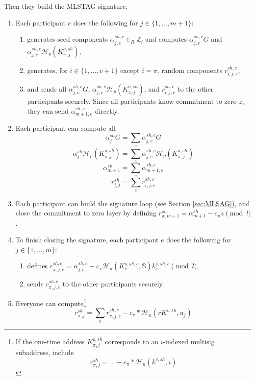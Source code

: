 Then they build the MLSTAG signature.

\begin{enumerate}
    \item Each participant $e$ does the following for $j \in \{1,...,m+1\}$:
    \begin{enumerate}
        \item generates seed components $\alpha^{sh,c}_{j,e} \in_R \mathbb{Z}_l$ and computes $\alpha^{sh,c}_{j,e} G$ and $\alpha^{sh,c}_{j,e} \mathcal{H}_p(K^{o,sh}_{\pi,j})$,
        \item generates, for $i \in \{1,...,v+1\}$ except $i = \pi$, random components $r^{sh,c}_{i,j,e}$,
        \item and sends all $\alpha^{sh,c}_{j,e} G$, $\alpha^{sh,c}_{j,e} \mathcal{H}_p(K^{o,sh}_{\pi,j})$, and $r^{sh,c}_{i,j,e}$ to the other participants securely. Since all participants know commitment to zero $z$, they can send $\alpha^{sh,c}_{m+1,e}$ directly.
    \end{enumerate}
    \item Each participant can compute all
    \[ \alpha^{sh}_{j} G = \sum_e \alpha^{sh,c}_{j,e} G\]
    \[ \alpha^{sh}_{j} \mathcal{H}_p(K^{o,sh}_{\pi,j}) = \sum_e \alpha^{sh,c}_{j,e} \mathcal{H}_p(K^{o,sh}_{\pi,j})\]
    \[ \alpha^{sh}_{m+1} = \sum_e \alpha^{sh,c}_{m+1,e}\]
    \[ r^{sh}_{i,j} = \sum_e r^{sh,c}_{i,j,e}\]
    \item Each participant can build the signature loop (see Section \ref{sec:MLSAG}), and close the commitment to zero layer by defining $r^{sh}_{\pi,m+1} = \alpha^{sh}_{m+1} - c_{\pi} z \pmod l$.
    \item To finish closing the signature, each participant $e$ does the following for $j \in \{1,...,m\}$:
    \begin{enumerate}
        \item defines $r^{sh,c}_{\pi,j,e} = \alpha^{sh,c}_{j,e} - c_{\pi} \mathcal{H}_n(K^{s,sh,c}_e,\mathbb{S}) k^{s,sh,c}_e \pmod l$,
        \item sends $r^{sh,c}_{\pi,j,e}$ to the other participants securely.
    \end{enumerate}
    \item Everyone can compute\footnote{If the one-time address $K^{o,sh}_{\pi,j}$ corresponds to an $i$-indexed multisig subaddress, include
    \[ r^{sh}_{\pi,j} = ... - c_{\pi}*\mathcal{H}_n(k^{v,sh},i)\]}
    \[ r^{sh}_{\pi,j} = \sum_e r^{sh,c}_{\pi,j,e} - c_{\pi}*\mathcal{H}_n(r K^{v,sh}, u_j) \]
\end{enumerate}


